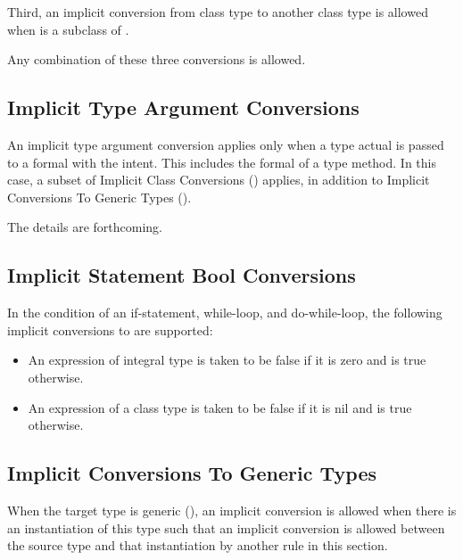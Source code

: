 Third, an implicit conversion from class type  to another class
type  is allowed when  is a subclass of .

Any combination of these three conversions is allowed.

\subsection{Implicit Type Argument Conversions}
\label{Implicit_Type_Arg_Conversions}

An implicit type argument conversion applies only when a type actual is
passed to a formal with the  intent. This includes the 
formal of a type method. In this case, a subset
of Implicit Class Conversions () applies,
in addition to Implicit Conversions To Generic Types
().

\begin{future}
The details are forthcoming.
\end{future}

\subsection{Implicit Statement Bool Conversions}
\label{Implicit_Statement_Bool_Conversions}

In the condition of an if-statement, while-loop, and do-while-loop,
the following implicit conversions to  are supported:
\begin{itemize}
\item An expression of integral type is taken to be false if it is zero and is true otherwise.
\item An expression of a class type is taken to be false if it is nil and is true otherwise.
\end{itemize}

\subsection{Implicit Conversions To Generic Types}
\label{Implicit_Generic_Type_Conversions}

When the target type  is generic (),
an implicit conversion is allowed when there is an instantiation
of this type such that an implicit conversion is allowed between
the source type and that instantiation by another rule in this section.

